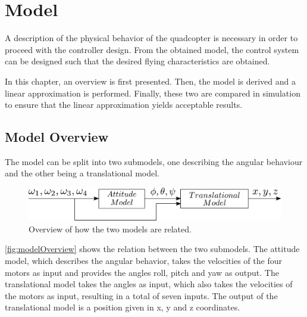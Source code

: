 \chapter{Model}\label{chap:Model}
A description of the physical behavior of the quadcopter is necessary in order to proceed with the controller design. From the obtained model, the control system can be designed such that the desired flying characteristics are obtained.

In this chapter, an overview is first presented. Then, the model is derived and a linear approximation is performed. Finally, these two are compared in simulation to ensure that the linear approximation yields acceptable results.

\section{Model Overview} \label{sec:ModelOverview}
The model can be split into two submodels, one describing the angular behaviour and the other being a translational model.
\begin{figure}[H]
    \centering
    \includegraphics[scale=0.3]{figures/modelOverview}
    \caption{Overview of how the two models are related.}
    \label{fig:modelOverview}
\end{figure}
%
\autoref{fig:modelOverview} shows the relation between the two submodels. The attitude model, which describes the angular behavior, takes the velocities of the four motors as input and provides the angles roll, pitch and yaw as output. The translational model takes the angles as input, which also takes the velocities of the motors as input, resulting in a total of seven inputs. The output of the translational model is a position given in x, y and z coordinates.

